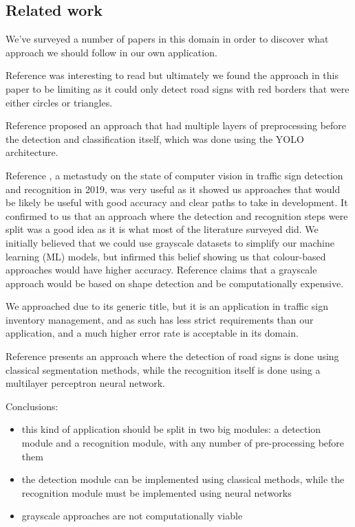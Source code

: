 \documentclass[conference]{IEEEtran}
\begin{document}

\subsection{Related work}
We've surveyed a number of papers in this domain in order to discover what approach we should follow in our
own application.

Reference \cite{4370763} was interesting to read but ultimately we found the approach in this paper
to be limiting as it could only detect road signs with red borders that were either circles or triangles.

Reference \cite{Karthika2022} proposed an approach that had multiple layers of preprocessing before
the detection and classification itself, which was done using the YOLO architecture.

Reference \cite{metastudy2019}, a metastudy on the state of computer vision in traffic sign detection and
recognition in 2019, was very useful as it showed us approaches that would be likely be useful
with good accuracy and clear paths to take in development. It confirmed to us that an approach where
the detection and recognition steps were split was a good idea as it is what most of the literature
surveyed did. We initially believed that we could use grayscale datasets to simplify our machine learning
(ML) models, but \cite{metastudy2019} infirmed this belief showing us that colour-based approaches would
have higher accuracy. Reference \cite{4290244} claims that a grayscale approach would be based on shape
detection and be computationally expensive.

We approached \cite{8709983} due to its generic title, but it is an application in traffic sign inventory
management, and as such has less strict requirements than our application, and a much higher error rate
is acceptable in its domain.

Reference \cite{6196571} presents an approach where the detection of road signs is done using classical
segmentation methods, while the recognition itself is done using a multilayer perceptron neural network.

Conclusions:
\begin{itemize}
    \item this kind of application should be split in two big modules: a detection module and a
    recognition module, with any number of pre-processing before them
    \item the detection module can be implemented using classical methods, while the recognition
    module must be implemented using neural networks
    \item grayscale approaches are not computationally viable
\end{itemize}
\end{document}
